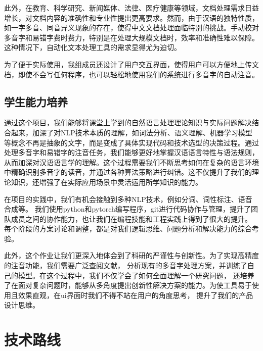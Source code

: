 \documentclass[12pt,hyperref,a4paper,UTF8]{ctexart}
\begin{document}
此外，在教育、科学研究、新闻媒体、法律、医疗健康等领域，文档处理需求日益增长，对文档内容的准确性和专业性提出更高要求。然而，由于汉语的独特性质，如一字多音、同音异义现象的存在，使得中文文档处理面临特别的挑战。手动校对多音字和易错字费时费力，特别是在处理大规模文档时，效率和准确性难以保障。这种情况下，自动化文本处理工具的需求显得尤为迫切。

为了便于实际使用，我组成员还设计了用户交互界面，使得用户可以方便地上传文档，即使不会写任何程序，也可以轻松地使用我们的系统进行多音字的自动注音。
\subsection{学生能力培养}
通过这个项目，我们能够将课堂上学到的自然语言处理理论知识与实际问题解决结合起来，加深了对NLP技术本质的理解，如词法分析、语义理解、机器学习模型等概念不再是抽象的文字，而是变成了具体实现代码和技术选型的决策过程。通过处理多音字和易错字的注音任务，我们能够更好地掌握汉语语言特性与语法规则，从而加深对汉语语言学的理解。这个过程需要我们不断思考如何在复杂的语言环境中精确识别多音字的读音，并通过各种算法策略进行纠错。这不仅提升了我们的理论知识，还增强了在实际应用场景中灵活运用所学知识的能力。

在项目的实践中，我们有机会接触到多种NLP技术，例如分词、词性标注、语音合成等。
我们使用python和pytorch编写程序，git进行代码协作与管理，提升了团队成员之间的协作能力，也让我们在编程技能和工程实践上得到了很大的提升。
每个阶段的方案讨论和调整，都是对我们逻辑思维、问题分析和解决能力的综合考验。

此外，这个作业让我们更深入地体会到了科研的严谨性与创新性。为了实现高精度的注音功能，我们需要广泛查阅文献，
分析现有的多音字处理方案，并训练了自己的模型。在这个过程中，我们不仅学会了如何全面理解一个研究问题，
还培养了在面对复杂问题时，能够从多角度提出创新性解决方案的能力。为使工具易于使用且效果直观，在ui界面时我们不得不站在用户的角度思考，
提升了我们的产品设计思维。
\section{技术路线}
\end{document}
